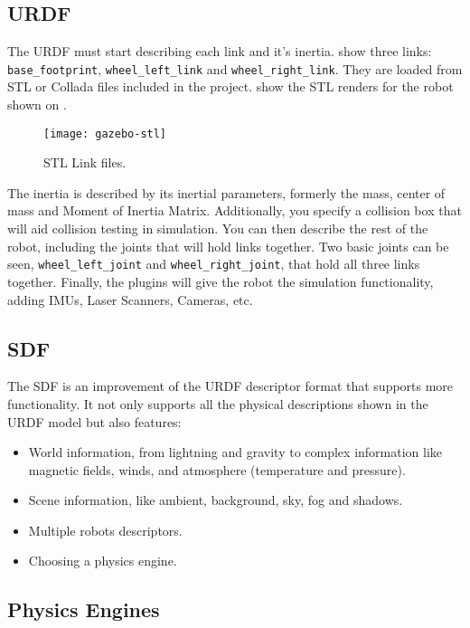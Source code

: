 \subsection{URDF}

The URDF must start describing each link and it's inertia.   show three links: \texttt{base\_footprint}, \texttt{wheel\_left\_link} and \texttt{wheel\_right\_link}. They are loaded from STL or Collada files included in the project.  show the STL renders for the robot shown on .

\begin{figure}[!ht]
\centering
\texttt{[image: gazebo-stl]}
\caption{STL Link files.}
\label{fig:gazebo-stl}
\end{figure}

The inertia is described by its inertial parameters, formerly the mass, center of mass and Moment of Inertia Matrix. Additionally, you specify a collision box that will aid collision testing in simulation. You can then describe the rest of the robot, including the joints that will hold links together. Two basic joints can be seen, \texttt{wheel\_left\_joint} and \texttt{wheel\_right\_joint}, that hold all three links together. Finally, the plugins will give the robot the simulation functionality, adding IMUs, Laser Scanners, Cameras, etc.

\subsection{SDF}

The SDF is an improvement of the URDF descriptor format that supports more functionality. It not only supports all the physical descriptions shown in the URDF model but also features:

\begin{itemize}
\item World information, from lightning and gravity to complex information like magnetic fields, winds, and atmosphere (temperature and pressure).
\item Scene information, like ambient, background, sky, fog and shadows.
\item Multiple robots descriptors.
\item Choosing a physics engine.
\end{itemize}

\subsection{Physics Engines}

